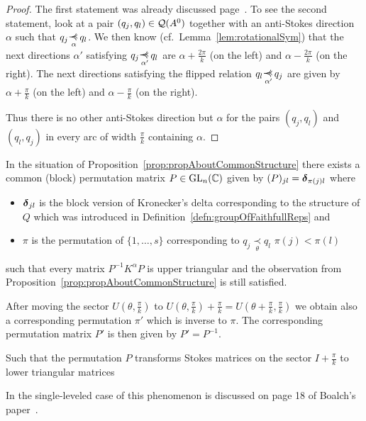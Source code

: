 \begin{proof}
  The first statement was already discussed
  page~\pageref{page:firstStatementOnTheStructure}.
  To see the second statement, look at a pair $(q_j,q_l)\in\mathcal{Q}(A^0)$ together
  with an anti-Stokes direction $\alpha$ such that $q_j\myrel{\alpha}q_l$. We
  then know (cf.\ Lemma~\ref{lem:rotationalSym}) that the next directions
  $\alpha'$ satisfying $q_j\myrel{\alpha'}q_l$ are $\alpha+\frac{2\pi}{k}$ (on
  the left) and $\alpha-\frac{2\pi}{k}$ (on the right).
  The next directions satisfying the flipped relation $q_l\myrel{\alpha'}q_j$
  are given by $\alpha+\frac{\pi}{k}$ (on the left) and
  $\alpha-\frac{\pi}{k}$ (on the right).

  Thus there is no other anti-Stokes direction but $\alpha$ for the pairs
  $(q_j,q_l)$ and $(q_l,q_j)$ in every arc of width $\frac{\pi}{k}$ containing
  $\alpha$.
\end{proof}
\begin{cor}\label{cor:someCorolaryToLabel}
  In the situation of Proposition~\ref{prop:propAboutCommonStructure}
  there exists a common (block) permutation matrix $P\in\operatorname{GL}_n(\mathbb{C})$ given by
  $(P)_{jl}=\boldsymbol{\delta}_{\pi(j)l}$ where
  \begin{itemize}
  \item $\boldsymbol{\delta}_{jl}$ is the block version of Kronecker's delta corresponding
    to the structure of $Q$ which was introduced in
    Definition~\ref{defn:groupOfFaithfullReps} and
  \item $\pi$ is the permutation of $\{1,\dots,s\}$ corresponding to
    $q_j\underset{\theta}{\prec}q_l$ \Rightarrow{} $\pi(j)<\pi(l)$
  \end{itemize}
  such that every matrix $P^{-1}K^{\alpha}P$ is upper triangular and the
  observation from Proposition~\ref{prop:propAboutCommonStructure} is still
  satisfied.
  \begin{s-rem}
    After moving the sector $U(\theta,\frac{\pi}{k})$ to
    $U(\theta,\frac{\pi}{k})+\frac{\pi}{k}
    =U(\theta+\frac{\pi}{k},\frac{\pi}{k})$ we obtain also a corresponding
    permutation $\pi'$ which is inverse to $\pi$.
    The corresponding permutation matrix $P'$ is then given by $P'=P^{-1}$.

    Such that the permutation $P$ transforms Stokes matrices on the sector
    $I+\frac{\pi}{k}$ to lower triangular matrices
  \end{s-rem}
  In the single-leveled case of this phenomenon is discussed on page 18 of
  Boalch's paper~\cite{boalch}.
\end{cor}

